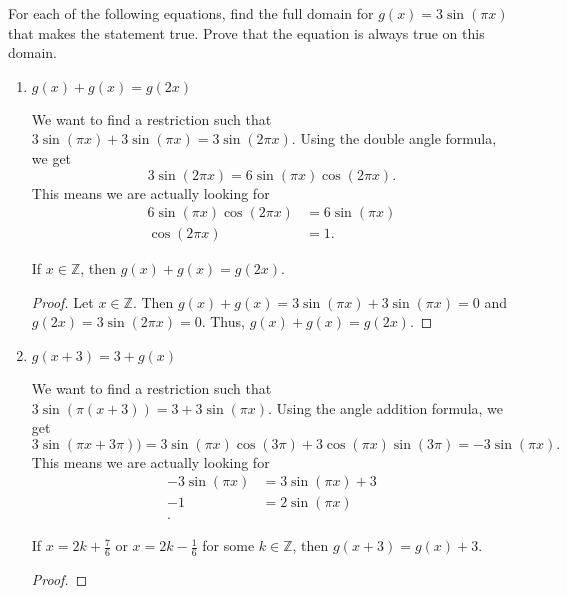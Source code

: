 \documentclass{../ximera}
\begin{document}
\begin{example}
 For each of the following equations, find the full domain for $g(x)=3\sin(\pi x)$ that
 makes the statement true. Prove that the equation is always true on this domain. 
	\begin{enumerate}
 		\item $g( x ) + g( x ) =g( 2x)$
		
		\begin{scratch}
		We want to find a restriction such that $3\sin(\pi x)+3\sin(\pi x)=3\sin(2\pi x)$. Using the double angle formula, we get \[3\sin(2\pi x)=6\sin(\pi x)\cos(2\pi x).\] This means we are actually looking for 
			\begin{align*}
 				6\sin(\pi x)\cos(2\pi x)&=6\sin(\pi x)\\
				\cos(2\pi x)&=1.
			\end{align*}
		\end{scratch}

		\begin{solution}
 		If $x\in\mathbb{Z}$, then $g(x)+g(x)=g(2 x)$.
 
		\begin{proof}
 		Let $x\in\mathbb{Z}$. Then $g(x)+g(x)=3\sin(\pi x)+3\sin(\pi x)=0$ and $g(2x)=3\sin(2\pi x)=0$. Thus, $g(x)+g(x)=g(2 x)$.
		\end{proof}
		\end{solution}

		\item $g( x + 3 )  = 3 +g( x)$
		
		\begin{scratch}
 			We want to find a restriction such that $3\sin(\pi (x+3))=3+3\sin(\pi x)$.
			Using the angle addition formula, we get 
			\[3\sin(\pi x+3\pi))=3\sin(\pi x)\cos(3\pi) +3\cos(\pi x)\sin(3\pi)=-3\sin(\pi x).\] This means we are actually looking for 
			\begin{align*}
 				-3\sin(\pi x)&=3\sin(\pi x)+3\\
				-1&=2\sin(\pi x)\\.
			\end{align*}
		\end{scratch}
		
		
		\begin{solution}
 		If $x=2k+\frac{7}{6}$ or $x=2k-\frac{1}{6}$ for some $k\in\mathbb{Z}$, then $g (x+3)=g(x)+3.$
		
		\begin{proof}
		

\end{proof}
\end{solution}
\end{enumerate}
\end{example}
\end{document}
